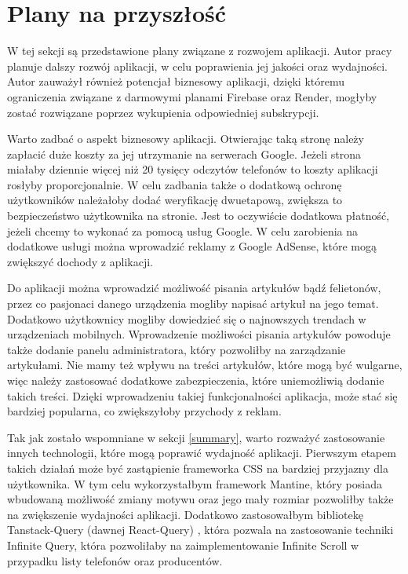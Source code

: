 \section{Plany na przyszłość}\label{future_plans}
W tej sekcji są przedstawione plany związane z rozwojem aplikacji. Autor pracy planuje dalszy rozwój aplikacji, w celu poprawienia jej jakości oraz wydajności. Autor  zauważył również potencjał biznesowy aplikacji, dzięki któremu ograniczenia związane z darmowymi planami Firebase oraz Render, mogłyby zostać rozwiązane poprzez wykupienia odpowiedniej subskrypcji.  

Warto zadbać o aspekt biznesowy aplikacji. Otwierając taką stronę należy zapłacić duże koszty za jej utrzymanie na serwerach Google. Jeżeli strona miałaby dziennie więcej niż 20 tysięcy odczytów telefonów to koszty aplikacji rosłyby proporcjonalnie. W celu zadbania także o dodatkową ochronę użytkowników należałoby dodać weryfikację dwuetapową, zwiększa to bezpieczeństwo użytkownika na stronie. Jest to oczywiście dodatkowa płatność, jeżeli chcemy to wykonać za pomocą usług Google. W celu zarobienia na dodatkowe usługi można wprowadzić reklamy z Google AdSense, które mogą zwiększyć dochody z aplikacji.

Do aplikacji można wprowadzić możliwość pisania artykułów bądź felietonów, przez co pasjonaci danego urządzenia mogliby napisać artykuł na jego temat. Dodatkowo użytkownicy mogliby dowiedzieć się o najnowszych trendach w urządzeniach mobilnych. Wprowadzenie możliwości pisania artykułów powoduje także dodanie panelu administratora, który pozwoliłby na zarządzanie artykułami. Nie mamy też wpływu na treści artykułów, które mogą być wulgarne, więc należy zastosować dodatkowe zabezpieczenia, które uniemożliwią dodanie takich treści. Dzięki wprowadzeniu takiej funkcjonalności aplikacja, może stać się bardziej popularna, co zwiększyłoby przychody z reklam.

Tak jak zostało wspomniane w sekcji \ref{summary}, warto rozważyć zastosowanie innych technologii, które mogą poprawić wydajność aplikacji. Pierwszym etapem takich działań może być zastąpienie frameworka CSS na bardziej przyjazny dla użytkownika. W tym celu wykorzystałbym framework Mantine, który posiada wbudowaną możliwość zmiany motywu oraz jego mały rozmiar pozwoliłby także na zwiększenie wydajności aplikacji. Dodatkowo zastosowałbym bibliotekę Tanstack-Query (dawnej React-Query) \cite{tanstack_query}, która pozwala na zastosowanie techniki Infinite Query, która pozwoliłaby na zaimplementowanie Infinite Scroll \cite{infinite_scroll} w przypadku listy telefonów oraz producentów.

